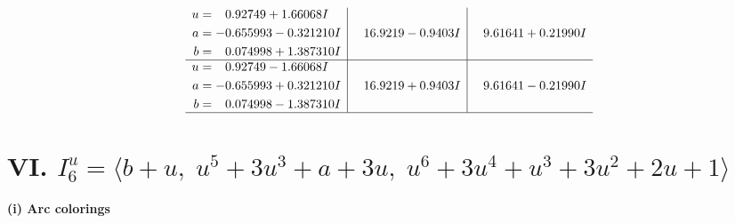 \documentclass[1p]{elsarticle_modified}
\theoremstyle{definition}
\begin{document}
$$\begin{array}{c|c|c}
\begin{aligned}
u &= \phantom{-}0.92749 + 1.66068 I \\
a &= -0.655993 - 0.321210 I \\
b &= \phantom{-}0.074998 + 1.387310 I\end{aligned}
 & \phantom{-}16.9219 - 0.9403 I & \phantom{-}9.61641 + 0.21990 I \\ \hline\begin{aligned}
u &= \phantom{-}0.92749 - 1.66068 I \\
a &= -0.655993 + 0.321210 I \\
b &= \phantom{-}0.074998 - 1.387310 I\end{aligned}
 & \phantom{-}16.9219 + 0.9403 I & \phantom{-}9.61641 - 0.21990 I\\
 \hline 
 \end{array}$$\newpage\newpage\renewcommand{\arraystretch}{1}
\centering \section*{VI. $I^u_{6}= \langle b+u,\;u^5+3 u^3+a+3 u,\;u^6+3 u^4+u^3+3 u^2+2 u+1 \rangle$}
\flushleft \textbf{(i) Arc colorings}\\
\end{document}
